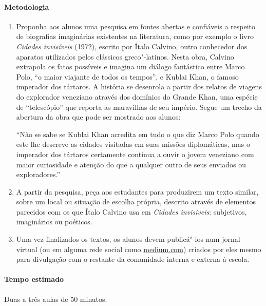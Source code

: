\documentclass[12pt]{extarticle}
\begin{document}
 \paragraph{Metodologia}
 	\begin{enumerate}
	\item
	Proponha aos alunos uma pesquisa em fontes abertas e confiáveis a respeito de biografias
	imaginárias existentes na literatura, como por exemplo o livro \emph{Cidades invisíveis} 
	(1972), escrito por Ítalo Calvino, outro conhecedor dos aparatos utilizados pelos clássicos
	greco"-latinos. Nesta obra, Calvino extrapola os fatos possíveis 
	e imagina um diálogo fantástico entre Marco Polo, ``o maior viajante de todos os tempos'', 
	e Kublai Khan, o famoso imperador dos tártaros. A história se desenrola a partir 
	dos relatos de viagens do explorador veneziano através dos domínios do 
	Grande Khan, uma espécie de ``telescópio'' que reporta as maravilhas de seu império.
	Segue um trecho da abertura da obra que pode ser mostrado aos alunos:

``Não se sabe se Kublai Khan acredita em tudo o que diz Marco Polo quando este lhe descreve as cidades visitadas em suas missões diplomáticas, mas o imperador dos tártaros certamente continua a ouvir o jovem veneziano com maior curiosidade e atenção do que a qualquer outro de seus enviados ou exploradores.''

	\item
	A partir da pesquisa, peça aos estudantes para produzirem um texto similar, 
	sobre um local ou situação de escolha própria, descrito 
	através de elementos parecidos com os que Ítalo Calvino usa 
	em \emph{Cidades invisíveis}: subjetivos, imaginários ou poéticos.


	\item
	Uma vez finalizados os textos, os alunos devem publicá"-los num jornal virtual 
	(ou em alguma rede social como \url{medium.com})
	criados por eles mesmo para divulgação com o restante da comunidade interna e 
	externa à escola.

 	\end{enumerate}

 \paragraph{Tempo estimado} Duas a três aulas de 50 minutos.

\end{document}
